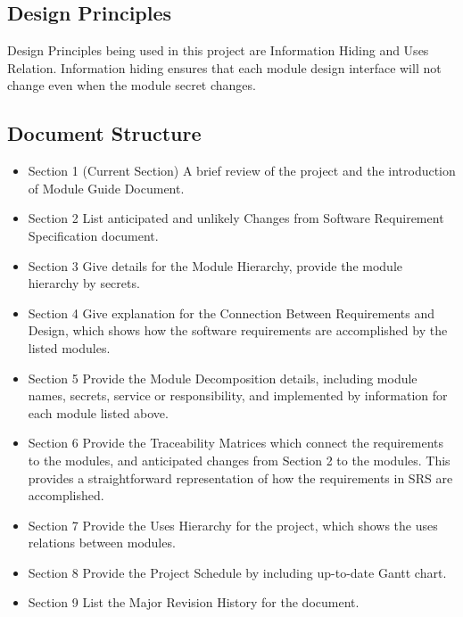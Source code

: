 \documentclass[12,english]{article}
\begin{document}
	\subsection{Design Principles}
	Design Principles being used in this project are Information Hiding and Uses Relation. Information hiding ensures that each module design interface will not change even when the module secret changes.
	

	\subsection{Document Structure}
	
\begin{itemize}

\item Section 1 \newline (Current Section) A brief review of the project and the introduction of Module Guide Document.

\item Section 2 \newline List anticipated and unlikely Changes from Software Requirement Specification document. 

\item Section 3 \newline Give details for the Module Hierarchy, provide the module hierarchy by secrets. 

\item Section 4 \newline Give explanation for the Connection Between Requirements and Design, which shows how the software requirements are accomplished by the listed modules. 

\item Section 5 \newline Provide the Module Decomposition details, including module names, secrets, service or responsibility, and implemented by information for each module listed above. 

\item Section 6 \newline Provide the Traceability Matrices which connect the requirements to the modules, and anticipated changes from Section 2 to the modules. This provides a straightforward representation of how the requirements in SRS are accomplished.

\item Section 7 \newline Provide the Uses Hierarchy for the project, which shows the uses relations between modules.

\item Section 8 \newline Provide the Project Schedule by including up-to-date Gantt chart.

\item Section 9 \newline List the Major Revision History for the document.
\end{itemize}	
\end{document}
